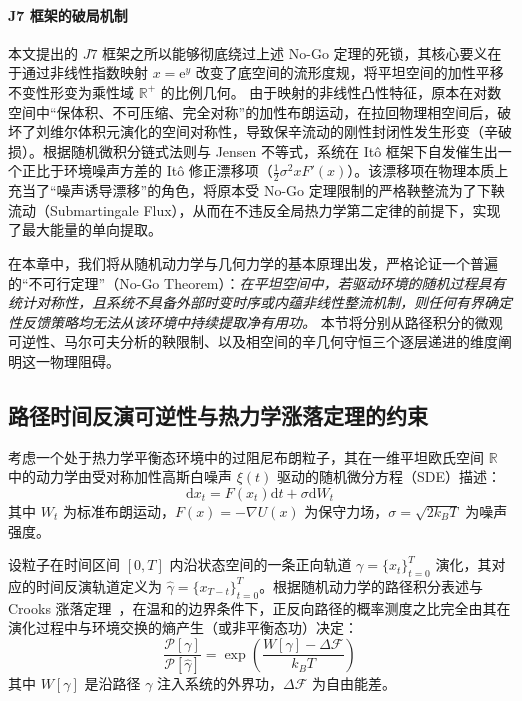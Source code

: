 ﻿\documentclass[10pt,a4paper]{article}
\numberwithin{equation}{section}
\begin{document}
\paragraph{J7 框架的破局机制}
本文提出的 $J7$ 框架之所以能够彻底绕过上述 No-Go 定理的死锁，其核心要义在于通过非线性指数映射 $x = \mathrm{e}^y$ 改变了底空间的流形度规，将平坦空间的加性平移不变性形变为乘性域 $\mathbb{R}^+$ 的比例几何。
由于映射的非线性凸性特征，原本在对数空间中“保体积、不可压缩、完全对称”的加性布朗运动，在拉回物理相空间后，破坏了刘维尔体积元演化的空间对称性，导致保辛流动的刚性封闭性发生形变（辛破损）。根据随机微积分链式法则与 Jensen 不等式，系统在 It\^{o} 框架下自发催生出一个正比于环境噪声方差的 It\^{o} 修正漂移项（$\frac{1}{2}\sigma^2 x F'(x)$）。该漂移项在物理本质上充当了“噪声诱导漂移”的角色，将原本受 No-Go 定理限制的严格鞅整流为了下鞅流动（Submartingale Flux），从而在不违反全局热力学第二定律的前提下，实现了最大能量的单向提取。

在本章中，我们将从随机动力学与几何力学的基本原理出发，严格论证一个普遍的“不可行定理”（No-Go Theorem）：\emph{在平坦空间中，若驱动环境的随机过程具有统计对称性，且系统不具备外部时变时序或内蕴非线性整流机制，则任何有界确定性反馈策略均无法从该环境中持续提取净有用功。} 本节将分别从路径积分的微观可逆性、马尔可夫分析的鞅限制、以及相空间的辛几何守恒三个逐层递进的维度阐明这一物理阻碍。

\subsection{路径时间反演可逆性与热力学涨落定理的约束}
\label{subsec:path_reversibility}

考虑一个处于热力学平衡态环境中的过阻尼布朗粒子，其在一维平坦欧氏空间 $\mathbb{R}$ 中的动力学由受对称加性高斯白噪声 $\xi(t)$ 驱动的随机微分方程（SDE）描述：
\begin{equation}
    \mathrm{d}x_t = F(x_t)\mathrm{d}t + \sigma \mathrm{d}W_t
\end{equation}
其中 $W_t$ 为标准布朗运动，$F(x) = -\nabla U(x)$ 为保守力场，$\sigma = \sqrt{2k_B T}$ 为噪声强度。

设粒子在时间区间 $[0, T]$ 内沿状态空间的一条正向轨道 $\gamma = \{x_t\}_{t=0}^T$ 演化，其对应的时间反演轨道定义为 $\hat{\gamma} = \{x_{T-t}\}_{t=0}^T$。根据随机动力学的路径积分表述与 Crooks 涨落定理~\cite{Crooks1999}，在温和的边界条件下，正反向路径的概率测度之比完全由其在演化过程中与环境交换的熵产生（或非平衡态功）决定：
\begin{equation}
    \frac{\mathcal{P}[\gamma]}{\mathcal{P}[\hat{\gamma}]} = \exp\left( \frac{W[\gamma] - \Delta \mathcal{F}}{k_B T} \right)
\end{equation}
其中 $W[\gamma]$ 是沿路径 $\gamma$ 注入系统的外界功，$\Delta \mathcal{F}$ 为自由能差。
\end{document}
